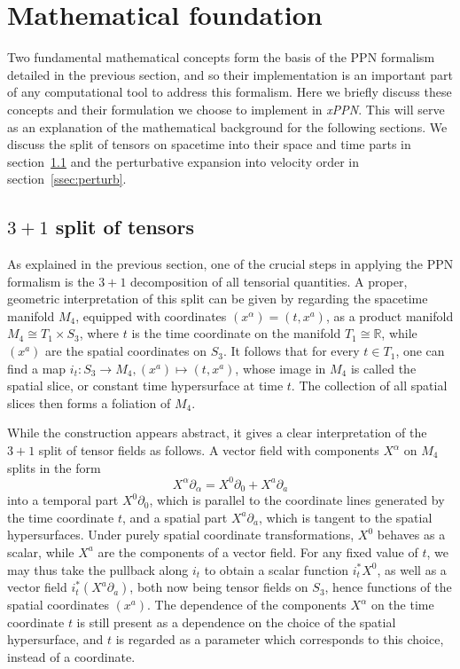 \documentclass[notitlepage,a4paper,aps,prd,onecolumn,superscriptaddress,nofootinbib,groupedaddress,longbibliography]{revtex4-1}
\newcommand{\xPPN}{\emph{xPPN}}
\begin{document}
\section{Mathematical foundation}\label{sec:concepts}
Two fundamental mathematical concepts form the basis of the PPN formalism detailed in the previous section, and so their implementation is an important part of any computational tool to address this formalism. Here we briefly discuss these concepts and their formulation we choose to implement in \xPPN. This will serve as an explanation of the mathematical background for the following sections. We discuss the split of tensors on spacetime into their space and time parts in section~\ref{ssec:31split} and the perturbative expansion into velocity order in section~\ref{ssec:perturb}.

\subsection{$3+1$ split of tensors}\label{ssec:31split}
As explained in the previous section, one of the crucial steps in applying the PPN formalism is the $3+1$ decomposition of all tensorial quantities. A proper, geometric interpretation of this split can be given by regarding the spacetime manifold \(M_4\), equipped with coordinates \((x^{\alpha}) = (t, x^a)\), as a product manifold \(M_4 \cong T_1 \times S_3\), where \(t\) is the time coordinate on the manifold \(T_1 \cong \mathbb{R}\), while \((x^a)\) are the spatial coordinates on \(S_3\). It follows that for every \(t \in T_1\), one can find a map \(i_t: S_3 \to M_4, (x^a) \mapsto (t, x^a)\), whose image in \(M_4\) is called the spatial slice, or constant time hypersurface at time \(t\). The collection of all spatial slices then forms a foliation of \(M_4\).

While the construction appears abstract, it gives a clear interpretation of the $3+1$ split of tensor fields as follows. A vector field with components \(X^{\alpha}\) on \(M_4\) splits in the form
\begin{equation}
X^{\alpha}\partial_{\alpha} = X^0\partial_0 + X^a\partial_a
\end{equation}
into a temporal part \(X^0\partial_0\), which is parallel to the coordinate lines generated by the time coordinate \(t\), and a spatial part \(X^a\partial_a\), which is tangent to the spatial hypersurfaces. Under purely spatial coordinate transformations, \(X^0\) behaves as a scalar, while \(X^a\) are the components of a vector field. For any fixed value of \(t\), we may thus take the pullback along \(i_t\) to obtain a scalar function \(i_t^*X^0\), as well as a vector field \(i_t^*(X^a\partial_a)\), both now being tensor fields on \(S_3\), hence functions of the spatial coordinates \((x^a)\). The dependence of the components \(X^{\alpha}\) on the time coordinate \(t\) is still present as a dependence on the choice of the spatial hypersurface, and \(t\) is regarded as a parameter which corresponds to this choice, instead of a coordinate.
\end{document}
